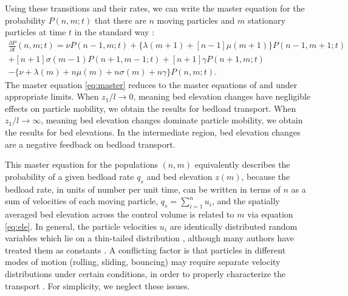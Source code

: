\documentclass{article}
\begin{document}
Using these transitions and their rates, we can write the master equation for the probability $P(n,m;t)$ that there are $n$ moving particles and $m$ stationary particles at time $t$ in the standard way \citep{Cox1965, Ancey2008}: 
\begin{multline}
 \frac{\partial P}{\partial t}(n,m;t) =  
\nu P(n-1,m;t) + 
\{\lambda(m+1) + [n-1]\mu(m+1)\}P(n-1,m+1;t)\\ + 
[n+1]\sigma(m-1)P(n+1,m-1;t) + 
[n+1]\gamma P(n+1,m;t) \\- 
\{ \nu + \lambda(m) + n\mu(m) + n\sigma(m) + n \gamma \}P(n,m;t)
. \label{eq:master}
\end{multline} 
The master equation \ref{eq:master} reduces to the master equations of \citet{Ancey2008} and \citet{Nakagawa1980} under appropriate limits. 
When $z_1/l \rightarrow 0$, meaning bed elevation changes have negligible effects on particle mobility, we obtain the \citet{Ancey2008} results for bedload transport. 
When $z_1/l \rightarrow \infty$, meaning bed elevation changes dominate particle mobility, we obtain the \citet{Nakagawa1980} results for bed elevations. 
In the intermediate region, bed elevation changes are a negative feedback on bedload transport. 

This master equation for the populations $(n,m)$ equivalently describes the probability of a given bedload rate $q_s$ and bed elevation $z(m)$, because the bedload rate, in units of number per unit time, can be written in terms of $n$ as a sum of velocities of each moving particle, $q_s = \sum_{i=1}^n u_i$, and the spatially averaged bed elevation across the control volume is related to $m$ via equation \ref{eq:ele}. 
In general, the particle velocities $u_i$ are identically distributed random variables which lie on a thin-tailed distribution \citep{Lajeunesse2010, Furbish2012, Fathel2015}, although many authors have treated them as constants \citep{Wiberg1985, Charru2004, Ancey2008}. A conflicting factor is that particles in different modes of motion (rolling, sliding, bouncing) may require separate velocity distributions under certain conditions, in order to properly characterize the transport  \citep{Frey2014}. For simplicity, we neglect these issues.
\end{document}
